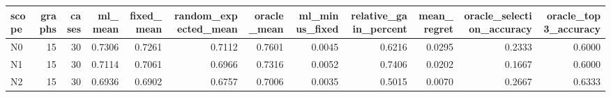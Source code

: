 \begin{tabular}{lrrrrrrrrrrr}
\toprule
scope & graphs & cases & ml_mean & fixed_mean & random_expected_mean & oracle_mean & ml_minus_fixed & relative_gain_percent & mean_regret & oracle_selection_accuracy & oracle_top3_accuracy \\
\midrule
N0 & 15 & 30 & 0.7306 & 0.7261 & 0.7112 & 0.7601 & 0.0045 & 0.6216 & 0.0295 & 0.2333 & 0.6000 \\
N1 & 15 & 30 & 0.7114 & 0.7061 & 0.6966 & 0.7316 & 0.0052 & 0.7406 & 0.0202 & 0.1667 & 0.6000 \\
N2 & 15 & 30 & 0.6936 & 0.6902 & 0.6757 & 0.7006 & 0.0035 & 0.5015 & 0.0070 & 0.2667 & 0.6333 \\
\bottomrule
\end{tabular}
